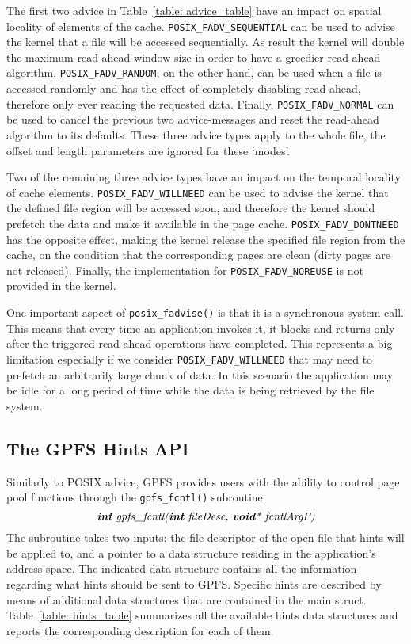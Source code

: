 The first two advice in Table~\ref{table: advice_table} have an impact on spatial locality of elements of the cache. \texttt{POSIX\_FADV\_SEQUENTIAL} can be used to advise the kernel that a file will be accessed sequentially. As result the kernel will double the maximum read-ahead window size in order to have a greedier read-ahead algorithm. \texttt{POSIX\_FADV\_RANDOM}, on the other hand, can be used when a file is accessed randomly and has the effect of completely disabling read-ahead, therefore only ever reading the requested data. Finally, \texttt{POSIX\_FADV\_NORMAL} can be used to cancel the previous two advice-messages and reset the read-ahead algorithm to its defaults. These three advice types apply to the whole file, the offset and length parameters are ignored for these `modes'.

Two of the remaining three advice types have an impact on the temporal locality of cache elements. \texttt{POSIX\_FADV\_WILLNEED} can be used to advise the kernel that the defined file region will be accessed soon, and therefore the kernel should prefetch the data and make it available in the page cache. \texttt{POSIX\_FADV\_DONTNEED} has the opposite effect, making the kernel release the specified file region from the cache, on the condition that the corresponding pages are clean (dirty pages are not released). Finally, the implementation for \texttt{POSIX\_FADV\_NOREUSE} is not provided in the kernel. %

One important aspect of \texttt{posix\_fadvise()} is that it is a synchronous system call. This means that every time an application invokes it, it blocks and returns only after the triggered read-ahead operations have completed. This represents a big limitation especially if we consider \texttt{POSIX\_FADV\_WILLNEED} that may need to prefetch an arbitrarily large chunk of data. In this scenario the application may be idle for a long period of time while the data is being retrieved by the file system.

\subsection{The GPFS Hints API}
\label{subsec: gpfs_hints_api}
Similarly to POSIX advice, GPFS provides users with the ability to control page pool functions through the \texttt{gpfs\_fcntl()} subroutine: $$\textit{\textbf{int} gpfs\_fcntl(\textbf{int} fileDesc, \textbf{void}* fcntlArgP)}$$ The subroutine takes two inputs: the file descriptor of the open file that hints will be applied to, and a pointer to a data structure residing in the application's address space. The indicated data structure contains all the information regarding what hints should be sent to GPFS. Specific hints are described by means of additional data structures that are contained in the main struct. Table~\ref{table: hints_table} summarizes all the available hints data structures and reports the corresponding description for each of them.

